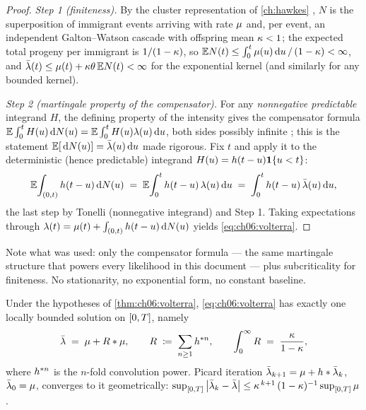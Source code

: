 \begin{proof}
\emph{Step 1 (finiteness).} By the cluster representation of
\cref{ch:hawkes} \citep{hawkesoakes1974}, $N$ is the superposition of
immigrant events arriving with rate $\mu$ and, per event, an independent
Galton--Watson cascade with offspring mean $\kappa < 1$; the expected
total progeny per immigrant is $1/(1-\kappa)$, so
$\mathbb{E} N(t) \le \int_0^t \mu(u)\,\mathrm{d} u \,/\, (1-\kappa) < \infty$, and
$\bar{\lambda}(t) \le \mu(t) + \kappa\theta \,\mathbb{E} N(t) < \infty$ for the
exponential kernel (and similarly for any bounded kernel).

\emph{Step 2 (martingale property of the compensator).} For any
\emph{nonnegative predictable} integrand $H$, the defining property of the
intensity gives the compensator formula
$\mathbb{E}\int_0^t H(u)\,\mathrm{d} N(u) = \mathbb{E} \int_0^t H(u)\lambda(u)\,\mathrm{d} u$, both sides
possibly infinite \citep[II.4]{abgk1993}; this is the statement
$\mathbb{E}[\,\mathrm{d} N(u)] = \bar{\lambda}(u)\,\mathrm{d} u$ made rigorous. Fix $t$ and apply it to the
deterministic (hence predictable) integrand $H(u) = h(t-u)\mathbf{1}\{u<t\}$:
\[
\mathbb{E}\!\int_{(0,t)} h(t-u)\,\mathrm{d} N(u)
 \;=\; \mathbb{E}\!\int_0^{t} h(t-u)\,\lambda(u)\,\mathrm{d} u
 \;=\; \int_0^{t} h(t-u)\,\bar{\lambda}(u)\,\mathrm{d} u ,
\]
the last step by Tonelli (nonnegative integrand) and Step 1. Taking
expectations through
$\lambda(t) = \mu(t) + \int_{(0,t)}h(t-u)\,\mathrm{d} N(u)$ yields
\cref{eq:ch06:volterra}.
\end{proof}

Note what was used: only the compensator formula --- the same martingale
structure that powers every likelihood in this document --- plus
subcriticality for finiteness. No stationarity, no exponential form, no
constant baseline.

\begin{theorem}\label{thm:ch06:neumann}
Under the hypotheses of \cref{thm:ch06:volterra},
\cref{eq:ch06:volterra} has exactly one locally bounded solution on
$[0,T]$, namely
\begin{equation}\label{eq:ch06:neumann}
\bar{\lambda} \;=\; \mu + R * \mu,
\qquad
R \;\coloneqq\; \sum_{n\ge 1} h^{*n},
\qquad
\int_0^\infty R \;=\; \frac{\kappa}{1-\kappa},
\end{equation}
where $h^{*n}$ is the $n$-fold convolution power. Picard iteration
$\bar{\lambda}_{k+1} = \mu + h * \bar{\lambda}_k$, $\bar{\lambda}_0 = \mu$, converges
to it geometrically:
$\sup_{[0,T]}\left|\bar{\lambda}_k - \bar{\lambda}\right| \le
\kappa^{\,k+1}\,(1-\kappa)^{-1} \sup_{[0,T]}\mu$.
\end{theorem}

